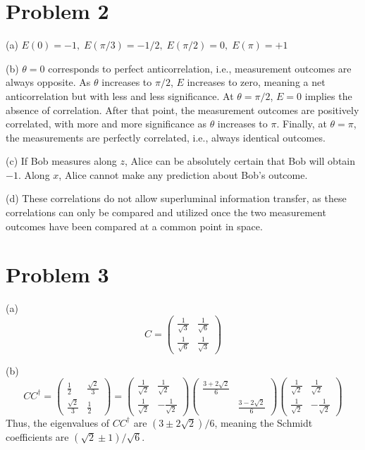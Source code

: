 \documentclass[11pt]{article}
\begin{document}
\section*{Problem 2}
\noindent
(a) $E(0) = -1,\; E(\pi/3) = -1/2,\; E(\pi/2) = 0,\; E(\pi) = +1$

\noindent
(b) $\theta=0$ corresponds to perfect anticorrelation, i.e., measurement outcomes are always opposite.
As $\theta$ increases to $\pi/2$, $E$ increases to zero, meaning a net anticorrelation
but with less and less significance.
At $\theta = \pi/2$, $E = 0$ implies the absence of correlation.
After that point, the measurement outcomes are positively correlated,
with more and more significance as $\theta$ increases to $\pi$.
Finally, at $\theta=\pi$, the measurements are perfectly correlated, i.e., always identical outcomes.

\noindent
(c) If Bob measures along $z$, Alice can be absolutely certain that Bob will obtain $-1$.
Along $x$, Alice cannot make any prediction about Bob's outcome.

\noindent
(d) These correlations do not allow superluminal information transfer,
as these correlations can only be compared and utilized once the two measurement outcomes
have been compared at a common point in space.

\section*{Problem 3}
\noindent
(a)
\[
    C = \begin{pmatrix} \frac{1}{\sqrt{3}} & \frac{1}{\sqrt{6}} \\
        \frac{1}{\sqrt{6}} & \frac{1}{\sqrt{3}}
    \end{pmatrix}
\]

\noindent
(b)
\[
    CC^\dagger = \begin{pmatrix}
        \frac{1}{2} & \frac{\sqrt{2}}{3} \\ \frac{\sqrt{2}}{3} & \frac{1}{2}
    \end{pmatrix} = \begin{pmatrix}
        \frac{1}{\sqrt{2}} & \frac{1}{\sqrt{2}} \\ \frac{1}{\sqrt{2}} & -\frac{1}{\sqrt{2}}
    \end{pmatrix} \begin{pmatrix}
        \frac{3+2\sqrt{2}}{6} & \\ & \frac{3-2\sqrt{2}}{6}
    \end{pmatrix} \begin{pmatrix}
        \frac{1}{\sqrt{2}} & \frac{1}{\sqrt{2}} \\ \frac{1}{\sqrt{2}} & -\frac{1}{\sqrt{2}}
    \end{pmatrix}
\]
Thus, the eigenvalues of $CC^\dagger$ are $(3\pm2\sqrt{2})/6$,
meaning the Schmidt coefficients are $(\sqrt{2}\pm1)/\sqrt{6}$.
\end{document}

